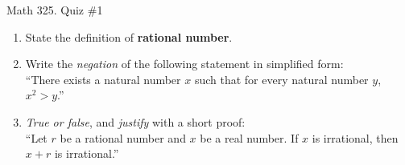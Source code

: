 \documentclass[12pt]{amsart}
\begin{document}
	
	\thispagestyle{empty}
	
	\begin{center}
		\Large{Math 325. Quiz \#1 }\\

	\end{center}
	
	
	
	\bigskip
	
	\begin{enumerate}
	
	\item State the definition of \textbf{rational number}.
	
	\vfill\vfill
	
	\item Write the \emph{negation} of the following statement in simplified form: \\
``There exists a natural number $x$ such that for every natural number $y$, $x^2>y$.''

\vfill\vfill

\item  \emph{True or false}, and \emph{justify} with a short proof:\\
``Let $r$ be a  rational number and $x$ be a real number. If $x$ is irrational, then $x+r$ is irrational.''
		
\vfill\vfill\vfill





\end{enumerate}


	
	
\end{document}
